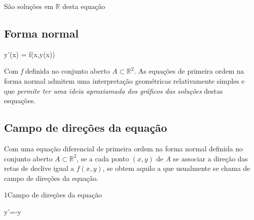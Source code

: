 \documentclass["AM3C-Slides_annotations.tex"]{subfiles}
\begin{document}
\begin{sectionBox}
\begin{multicols}{2}
\begin{exampleBox}
      São soluções em \(\mathbb{R}\) desta equação
    \end{exampleBox}
  \end{multicols}

  \subsection*{Forma normal}
  \begin{BM}
    y'(x) = f(x,y(x))
  \end{BM}
  Com \textit{f} definida no conjunto aberto \(A\subset\mathbb{R}^2\).
  As equações de primeira ordem na forma normal admitem uma interpretação geométricas relativamente simples e que \emph{permite ter uma ideia aproxiamada dos gráficos das soluções} destas esquações.

  \subsection*{Campo de direções da equação}
  Com uma equação diferencial de primeira ordem na forma normal definida no conjunto aberto \(A\subset\mathbb{R}^2\), se a cada ponto \((x,y)\) de \textit{A} se associar a direção das retas de declive igual a \(f(x,y)\), se obtem aquilo a que usualmente se chama de campo de direções da equação.

  \begin{exampleBox}1{Campo de direções da equação} %
    \begin{BM}
      y'=-y
    \end{BM}
    \begin{center}
    \end{center}
    
  \end{exampleBox}
\end{sectionBox}
\end{document}
